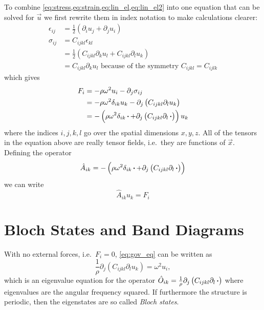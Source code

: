 To combine \cref{eq:stress,eq:strain,eq:lin_el,eq:lin_el2} into one equation that can be solved for $\vec{u}$ we first
rewrite them in index notation to make calculations clearer:
\begin{align}
	\epsilon_{ij} &= \frac12(\partial_i u_j + \partial_j u_i)\\
	\sigma_{ij} &= C_{ijkl} \epsilon_{kl}\\
				&= \frac12\left(C_{ijkl} \partial_k u_l + C_{ijkl} \partial_l
				u_k\right)\\
				&= C_{ijkl} \partial_k u_l\text{ because of the symmetry
				$C_{ijkl}=C_{ijlk}$}
\end{align}
which gives
\begin{align}
	F_{i} &= -\rho \omega^2 u_{i} - \partial_j \sigma_{ij}\\
		   &= -\rho \omega^2 \delta_{ik} u_{k} -
		   \partial_j \left(C_{ijkl} \partial_l u_k\right)\\
		   &= -\left(\rho \omega^2 \delta_{ik} \operatorname{\boldsymbol{\cdot}} + 
		   \partial_j \left(C_{ijkl} \partial_l \operatorname{\boldsymbol{\cdot}}\right)\right) u_k
\end{align}
where the indices $i,j,k,l$ go over the spatial dimensions $x,y,z$.
All of the tensors in the equation above are really tensor fields, i.e.\ they are
functions of $\vec{x}$.
Defining the operator
\begin{equation}\label{eq:A_def}
	\hat A_{ik} =
	-\left(\rho \omega^2 \delta_{ik} \operatorname{\boldsymbol{\cdot}} +
	\partial_j \left(C_{ijkl} \partial_l \operatorname{\boldsymbol{\cdot}}\right)\right)
\end{equation}
we can write
\begin{equation}\label{eq:gov_eq}
	\hat A_{ik} u_k = F_i
\end{equation}

\section{Bloch States and Band Diagrams}\label{sec:bloch}

With no external forces, i.e.\ $F_i = 0$, \cref{eq:gov_eq} can be written as
\begin{equation}
	\frac 1 \rho \partial_j \left(C_{ijkl} \partial_l u_k\right) = \omega^2 u_i,
\end{equation}
which is an eigenvalue equation for the operator
$\hat O_{ik} = \frac 1 \rho\partial_j \left(C_{ijkl} \partial_l \operatorname{\boldsymbol{\cdot}}\right)$
where eigenvalues are the angular frequency squared.
If furthermore the structure is periodic, then the eigenstates are so called
\emph{Bloch states}.

